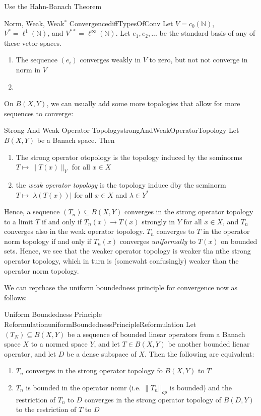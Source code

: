 \documentclass[oneside]{book}
\newcommand{\N}{\mathbb{N}}
\newcommand{\sse}{\subseteq}
\begin{document}
\begin{Proof}
Use the Hahn-Banach Theorem
\end{Proof}

\begin{example}{Norm, Weak, Weak$^*$ Convergence}{diffTypesOfConv}
	Let $V = c_0(\N)$, $V^* = \ell^1(\N)$, and $V^{**} = \ell^\infty(\N)$. Let $e_1, e_2, ...$ be the
	standard basis of any of these vetor-spaces.
	\begin{enumerate}
		\item  The sequence $(e_i)$ converges weakly in $V$ to zero, but not not converge in norm in $V$
		\item
	\end{enumerate}
\end{example}

On $B(X,Y)$, we can usually add some more topologies that allow for more sequences to converge:

\begin{defn}{Strong And Weak Operator Topology}{strongAndWeakOperatorTopology}
	Let $B(X, Y)$ be a Banach space. Then
	\begin{enumerate}
		\item The strong operator otopology is the topology induced by the seminorms $T \mapsto \|T(x)\|_Y$
			for all $x \in X$
		\item the \emph{weak operator topology} is the topology induce dby the seminorm $T \mapsto
			|\lambda(T(x))|$ for all $x \in X$ and $\lambda \in Y^*$
	\end{enumerate}
\end{defn}

Hence, a sequence $(T_n) \sse B(X, Y)$ converges in the strong operator topology to a limit $T$ if and only if $T_n(x)
\to T(x)$ strongly in $Y$ for all $x \in X$, and $T_n$ converges also in the weak operator topology. $T_n$ converges to
$T$ in the operator norm topology if and only if $T_n(x)$ converges \emph{uniformally} to $T(x)$ on bounded sets.
Hence, we see that the weaker operator topology is weaker tha nthe strong operator topology, which in turn is
(somewaht confusingly) weaker than the operator norm topology.

We can reprhase the uniform boundedness principle for convergence now as follows:

\begin{prop}{Uniform Boundedness Principle Reformulation}{uniformBoundednessPrincipleReformulation}
	Let $(T_N) \sse B(X,Y)$ be a sequence of bounded linear operators from a Banach space $X$ to a normed space
	$Y$, and let $T \in B(X, Y)$ be another bounded lienar operator, and let $D$ be a dense subspace of $X$.
	Then the following are equivalent:
	\begin{enumerate}
		\item $T_n$ converges in the strong operator topology fo $B(X, Y)$ to $T$
		\item $T_n$ is bounded in the operator nomr (i.e. $\|T_n||_{op}$ is bounded) and the restriction
			of $T_n$ to $D$ converges in the strong operator topology of $B(D, Y)$ to the restriction of
			$T$ to $D$
	\end{enumerate}
\end{prop}
\end{document}
